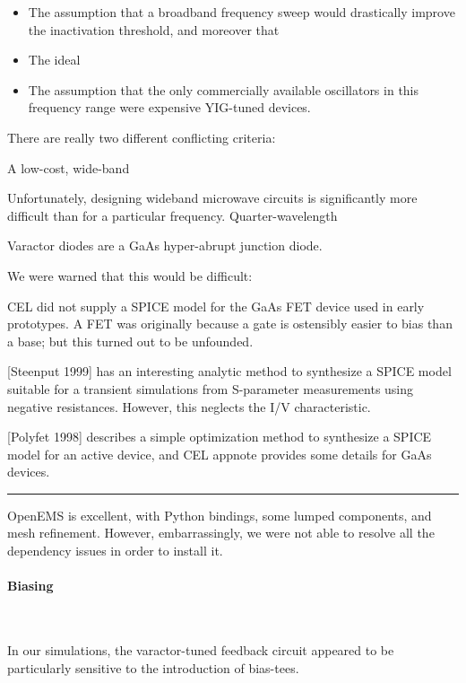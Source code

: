 \documentclass[paper.tex]{subfiles}
\begin{document}
\begin{itemize}
	\item The assumption that a broadband frequency sweep would drastically improve the inactivation threshold, and moreover that 
	\item The ideal 
	\item The assumption that the only commercially available oscillators in this frequency range were expensive YIG-tuned devices.
\end{itemize}

There are really two different conflicting criteria: 

A low-cost, wide-band

Unfortunately, designing wideband microwave circuits is significantly more difficult than for a particular frequency. Quarter-wavelength 

Varactor diodes are a GaAs hyper-abrupt junction diode.

We were warned that this would be difficult: 



CEL did not supply a SPICE model for the GaAs FET device used in early prototypes. A FET was originally because a gate is ostensibly easier to bias than a base; but this turned out to be unfounded.

[Steenput 1999] has an interesting analytic method to synthesize a SPICE model suitable for a transient simulations from S-parameter measurements using negative resistances. However, this neglects the I/V characteristic. 

[Polyfet 1998] describes a simple optimization method to synthesize a SPICE model for an active device, and CEL appnote provides some details for GaAs devices.



\rule{\linewidth}{0.2pt}

OpenEMS is excellent, with Python bindings, some lumped components, and mesh refinement. However, embarrassingly, we were not able to resolve all the dependency issues in order to install it.





\paragraph{Biasing}\

In our simulations, the varactor-tuned feedback circuit appeared to be particularly sensitive to the introduction of bias-tees. 
\end{document}
